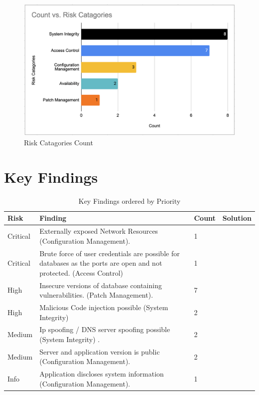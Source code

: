 \begin{figure}[h!]
\centering
\includegraphics[width=\textwidth]{pics/risk_cat.png}
\caption{Risk Catagories Count}\label{fig:bar_risks}
\end{figure}

\section{Key Findings}
\begingroup
\centering
\setlength{\tabcolsep}{6.5pt} %
\renewcommand{\arraystretch}{1.8} %
\begin{longtable}{ |p{1.5cm}| p{6cm}|p{1.3cm}|p{5cm}|}
\caption{Key Findings ordered by Priority}
    \label{table:key_findings}
\hline
\rowcolor{grey!15}
\textbf{Risk}  & \textbf{Finding}& \textbf{Count}& \textbf{Solution}\\
\hline
\cellcolor{red!95} Critical  & Externally exposed Network Resources 
\newline (Configuration Management). & 1 &
\\
\hline
\cellcolor{red!95} Critical  & Brute force of user credentials are possible for databases as the ports are open and not protected. 
\newline (Access Control) &1&
\\
\hline
\cellcolor{red!70} High  & Insecure versions of database containing vulnerabilities.
\newline (Patch Management).& 7 &
\\
\hline
\cellcolor{red!70} High  & Malicious Code injection possible 
\newline (System Integrity)& 2 &
\\
\hline
\cellcolor{yellow!95} Medium  & Ip spoofing / DNS server spoofing possible
\newline (System Integrity) .& 2 &
\\
\hline
\cellcolor{yellow!95} Medium  & Server and application version is public 
\newline(Configuration Management).& 2 &
\\
\hline
\cellcolor{grey!55} Info  & Application discloses system information
\newline (Configuration Management).& 1 &
\\
\hline
\end{longtable}
\endgroup
\newpage
